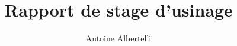\documentclass[a4paper]{report}
\author{Antoine Albertelli}
\title{Rapport de stage d'usinage}
\begin{document}

\tableofcontents

\appendix

\nocite{*} %


\end{document}
